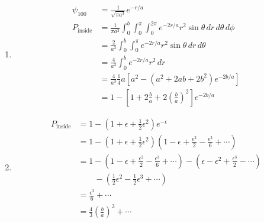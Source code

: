 \documentclass{article}
\begin{document}
\begin{enumerate}
  \item

        \begin{align*}
          \psi_{1 0 0}    & = \frac{1}{\sqrt{\pi a^3}} e^{-r / a}                                                                         \\
          P_\text{inside} & = \frac{1}{\pi a^3} \int_0^b \int_0^\pi \int_0^{2 \pi} e^{-2 r / a} r^2 \sin \theta \,d r \,d \theta \,d \phi \\
                          & = \frac{2}{a^3} \int_0^b \int_0^\pi e^{-2 r / a} r^2 \sin \theta \,d r \,d \theta                             \\
                          & = \frac{4}{a^3} \int_0^b e^{-2 r / a} r^2 \,d r                                                               \\
                          & = \frac{4}{a^3} \frac{1}{4} a \left[ a^2 - \left( a^2 + 2 a b + 2 b^2 \right) e^{-2 b / a} \right]            \\
                          & = 1 - \left[ 1 + 2 \frac{b}{a} + 2 \left( \frac{b}{a} \right)^2 \right] e^{-2 b / a}
        \end{align*}

  \item

        \begin{align*}
          P_\text{inside} & = 1 - \left( 1 + \epsilon + \frac{1}{2} \epsilon^2 \right) e^{-\epsilon}                                                                                        \\
                          & = 1 - \left( 1 + \epsilon + \frac{1}{2} \epsilon^2 \right) \left( 1 - \epsilon + \frac{\epsilon^2}{2} - \frac{\epsilon^3}{6} + \cdots \right)                   \\
                          & = 1 - \left( 1 - \epsilon + \frac{\epsilon^2}{2} - \frac{\epsilon^3}{6} + \cdots \right) - \left( \epsilon - \epsilon^2 + \frac{\epsilon^3}{2} - \cdots \right) \\
                          & \qquad - \left( \frac{1}{2} \epsilon^2 - \frac{1}{2} \epsilon^3 + \cdots \right)                                                                                \\
                          & = \frac{\epsilon^3}{6} + \cdots                                                                                                                                 \\
                          & = \frac{4}{3} \left( \frac{b}{a} \right)^3 + \cdots
        \end{align*}


\end{enumerate}
\end{document}
